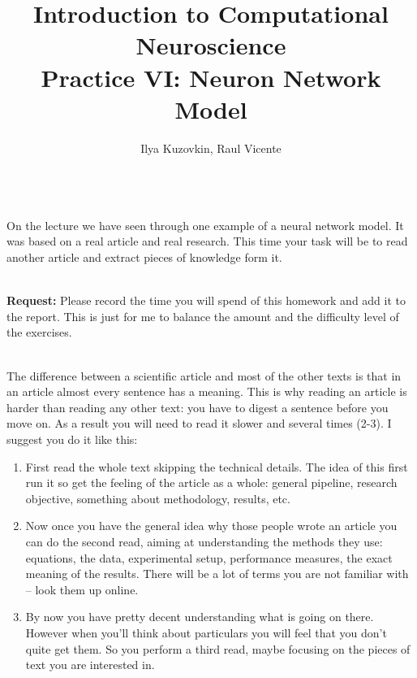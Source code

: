\documentclass[a4paper,11pt]{article}
\author{\large{Ilya Kuzovkin, Raul Vicente}}
\title{\huge{Introduction to Computational Neuroscience}\\\LARGE{Practice VI: Neuron Network Model}}
\begin{document}
\maketitle


%
%
\ \\
On the lecture we have seen through one example of a neural network model. It was based on a real article and real research. This time your task will be to read another article and extract pieces of knowledge form it. 

\ \\
\textbf{Request:} Please record the time you will spend of this homework and add it to the report. This is just for me to balance the amount and the difficulty level of the exercises.

\ \\
The difference between a scientific article and most of the other texts is that in an article almost every sentence has a meaning. This is why reading an article is harder than reading any other text: you have to digest a sentence before you move on. As a result you will need to read it slower and several times (2-3). I suggest you do it like this:
\begin{enumerate}[label=\alph*)]
	\item First read the whole text skipping the technical details. The idea of this first run it so get the feeling of the article as a whole: general pipeline, research objective, something about methodology, results, etc.
	\item Now once you have the general idea why those people wrote an article you can do the second read, aiming at understanding the methods they use: equations, the data, experimental setup, performance measures, the exact meaning of the results. There will be a lot of terms you are not familiar with -- look them up online.
	\item By now you have pretty decent understanding what is going on there. However when you'll think about particulars you will feel that you don't quite get them. So you perform a third read, maybe focusing on the pieces of text you are interested in.
\end{enumerate}
\end{document}
